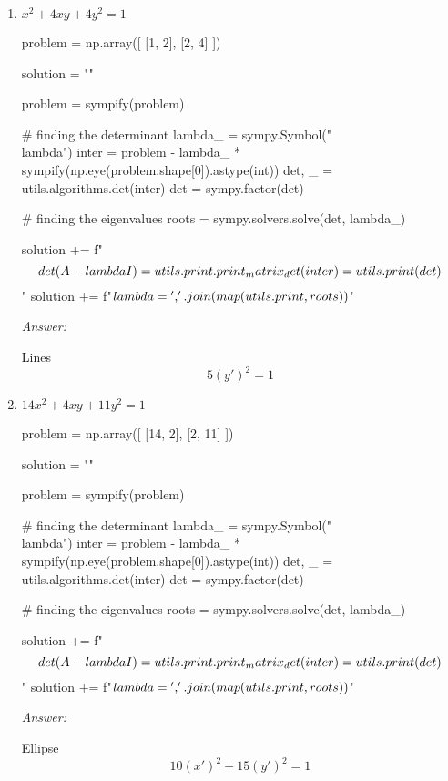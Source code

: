 \documentclass[letterpaper]{article}
\newcommand{\ans}{\textit{Answer: }}
\newenvironment{question}[2][Question]{\begin{trivlist}
\item[\hskip \labelsep {\bfseries #1}\hskip \labelsep {\bfseries #2.}]}{\end{trivlist}}
\begin{document}
\begin{question}{6.108}
\begin{enumerate}[label=(\alph*)]
\begin{pycode}
    \end{pycode}

    \ans
    
    Ellipse
    $$(3 + \sqrt{17})(x')^2 + (3 - \sqrt{17})(y')^2 = 1$$

    \item $x^{2}+4 x y+4 y^{2}=1$
    \begin{pycode}
problem = np.array([
  [1, 2],
  [2, 4]
])

solution = ""

problem = sympify(problem)

# finding the determinant 
lambda_ = sympy.Symbol("\\lambda")
inter = problem - lambda_ * sympify(np.eye(problem.shape[0]).astype(int))
det, _ = utils.algorithms.det(inter)
det = sympy.factor(det)

# finding the eigenvalues
roots = sympy.solvers.solve(det, lambda_)

solution += f"$$\\det(A - \\lambda I) = {utils.print.print_matrix_det(inter)} = {utils.print(det)}$$\n"
solution += f"$\\lambda = {', '.join(map(utils.print, roots))}$\n"

    \end{pycode}

    \ans
    
    Lines
    $$5(y')^2 = 1$$

    \item $14 x^{2}+4 x y+11 y^{2}=1$
    \begin{pycode}
problem = np.array([
  [14, 2],
  [2, 11]
])

solution = ""

problem = sympify(problem)

# finding the determinant 
lambda_ = sympy.Symbol("\\lambda")
inter = problem - lambda_ * sympify(np.eye(problem.shape[0]).astype(int))
det, _ = utils.algorithms.det(inter)
det = sympy.factor(det)

# finding the eigenvalues
roots = sympy.solvers.solve(det, lambda_)

solution += f"$$\\det(A - \\lambda I) = {utils.print.print_matrix_det(inter)} = {utils.print(det)}$$\n"
solution += f"$\\lambda = {', '.join(map(utils.print, roots))}$\n"

    \end{pycode}

    \ans
    
    Ellipse
    $$10(x')^2 + 15(y')^2 = 1$$ 
  \end{enumerate}
  
\end{question}
\end{document}
